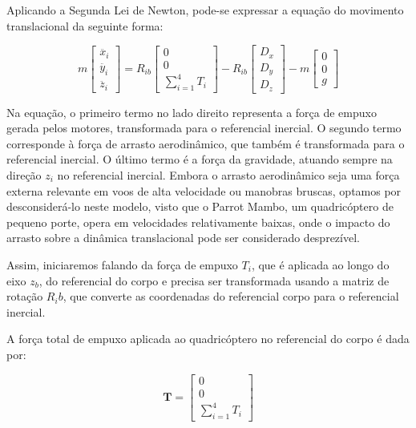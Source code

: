 Aplicando a Segunda Lei de Newton, pode-se expressar a equação do movimento translacional da seguinte forma:

\begin{equation}
m \begin{bmatrix}
\ddot{x_i} \\
\ddot{y_i} \\
\ddot{z_i}
\end{bmatrix} = R_{ib}
\begin{bmatrix}
0 \\
0 \\
\sum_{i=1}^{4} T_i
\end{bmatrix} - R_{ib}
\begin{bmatrix}
D_x \\
D_y \\
D_z
\end{bmatrix} - m
\begin{bmatrix}
0 \\
0 \\
g
\end{bmatrix}
\end{equation}

Na equação, o primeiro termo no lado direito representa a força de empuxo gerada pelos motores, transformada para o referencial inercial. O segundo termo corresponde à força de arrasto aerodinâmico, que também é transformada para o referencial inercial. O último termo é a força da gravidade, atuando sempre na direção $z_i$ no referencial inercial. Embora o arrasto aerodinâmico seja uma força externa relevante em voos de alta velocidade ou manobras bruscas, optamos por desconsiderá-lo neste modelo, visto que o Parrot Mambo, um quadricóptero de pequeno porte, opera em velocidades relativamente baixas, onde o impacto do arrasto sobre a dinâmica translacional pode ser considerado desprezível.

Assim, iniciaremos falando da força de empuxo $T_i$, que é aplicada ao longo do eixo $z_b$, do referencial do corpo e precisa ser transformada usando a matriz de rotação $R_ib$, que converte as coordenadas do referencial corpo para o referencial inercial.

A força total de empuxo aplicada ao quadricóptero no referencial do corpo é dada por:

\begin{equation}
\mathbf{T} = \begin{bmatrix}
0 \\
0 \\
\sum_{i=1}^{4} T_i
\end{bmatrix}
\end{equation}


